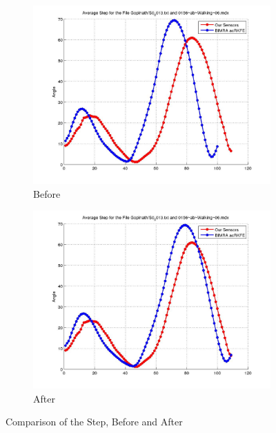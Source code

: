 \documentclass[12pt]{article}
\begin{document}
\begin{figure}[h]%

\begin{subfigure}[!htb]{2cm}
\hspace*{-2cm} \includegraphics[scale=.22]{S0_0013_before.jpg}
\caption{Before}
\end{subfigure}
\hfill\hfill
\begin{subfigure}[h]{0.4\textwidth}
\hspace*{-2cm} \includegraphics[scale=.22]{S0_0013_after.jpg}
\caption{After}
\end{subfigure}%

\caption[Hello]{Comparison of the Step, Before and After}
\end{figure}
\end{document}
